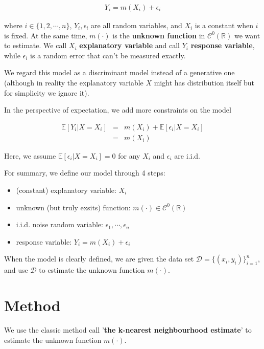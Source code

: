 \documentclass[twoside]{article}
\begin{document}
\begin{eqnarray}
  Y_i = m(X_i) + \epsilon_i
\end{eqnarray}

where $i \in \{1, 2,\cdots, n\}$, $Y_i, \epsilon_i$ are all random variables, and $X_i$ is a constant when $i$ is fixed. At the same time, $m(\cdot)$ is the \textbf{unknown function} in $\mathcal{C}^{0}(\mathbb{R})$ we want to estimate. We call $X_i$ \textbf{explanatory variable} and call $Y_i$ \textbf{response variable}, while $\epsilon_i$ is a random error that can't be measured exactly.

We regard this model as a discriminant model instead of a generative one (although in reality the explanatory variable $X$ might has distribution itself but for simplicity we ignore it).

In the perspective of expectation, we add more constraints on the model

\begin{eqnarray}
  \mathbb{E}[Y_i\lvert X=X_i] &=& m(X_i) + \mathbb{E}[\epsilon_i\lvert X=X_i] \\
  &=& m(X_i)
\end{eqnarray}

Here, we assume $\mathbb{E}[\epsilon_i\lvert X=X_i]=0$ for any $X_i$ and $\epsilon_i$ are i.i.d.

For summary, we define our model through 4 steps:

\begin{itemize}
  \item (constant) explanatory variable: $X_i$
  \item unknown (but truly exsits) function: $m(\cdot) \in \mathcal{C}^{0}(\mathbb{R})$
  \item i.i.d. noise random variable: $\epsilon_1, \cdots, \epsilon_n$
  \item response variable: $Y_i = m(X_i) + \epsilon_i$
\end{itemize}

When the model is clearly defined, we are given the data set $\mathcal{D}=\{(x_i,y_i)\}_{i=1}^n$, and use $\mathcal{D}$ to estimate the unknown function $m(\cdot)$.

\section{Method}

We use the classic method call '\textbf{the k-nearest neighbourhood estimate}' to estimate the unknown function $m(\cdot)$.
\end{document}
